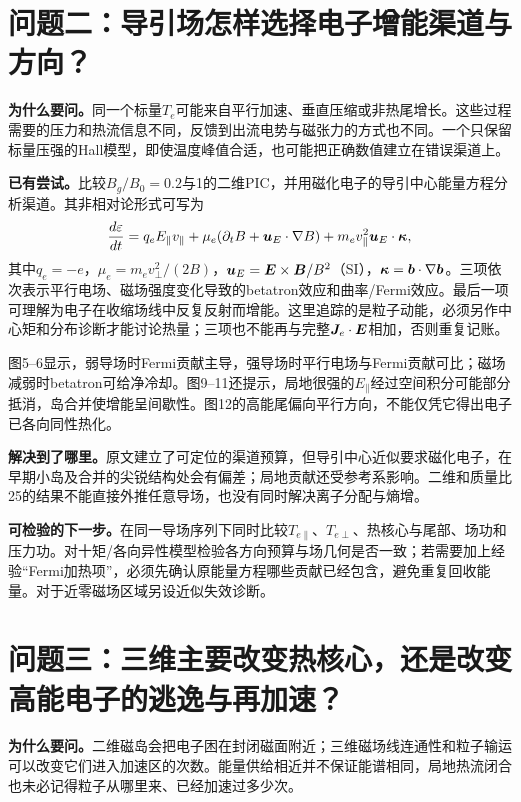 \section{问题二：导引场怎样选择电子增能渠道与方向？}
\textbf{为什么要问。}同一个标量$T_e$可能来自平行加速、垂直压缩或非热尾增长。这些过程需要的压力和热流信息不同，反馈到出流电势与磁张力的方式也不同。一个只保留标量压强的Hall模型，即使温度峰值合适，也可能把正确数值建立在错误渠道上。

\textbf{已有尝试。}\citet{Dahlin2014Mechanisms}比较$B_g/B_0=0.2$与1的二维PIC，并用磁化电子的导引中心能量方程分析渠道。其非相对论形式可写为
\begin{equation}
 \frac{d\varepsilon}{dt}
 =q_eE_\parallel v_\parallel
 +\mu_e(\partial_t B+\bm{u}_E\cdot\nabla B)
 +m_ev_\parallel^2\bm{u}_E\cdot\bm{\kappa},
 \label{eq:question-gc}
\end{equation}
其中$q_e=-e$，$\mu_e=m_ev_\perp^2/(2B)$，$\bm{u}_E=\bm{E}\times\bm{B}/B^2$（SI），$\bm{\kappa}=\bm{b}\cdot\nabla\bm{b}$。三项依次表示平行电场、磁场强度变化导致的betatron效应和曲率/Fermi效应。最后一项可理解为电子在收缩场线中反复反射而增能。这里追踪的是粒子动能，必须另作中心矩和分布诊断才能讨论热量；三项也不能再与完整$\bm{J}_e\cdot\bm{E}$相加，否则重复记账。

图5--6显示，弱导场时Fermi贡献主导，强导场时平行电场与Fermi贡献可比；磁场减弱时betatron可给净冷却。图9--11还提示，局地很强的$E_\parallel$经过空间积分可能部分抵消，岛合并使增能呈间歇性。图12的高能尾偏向平行方向，不能仅凭它得出电子已各向同性热化。\citep{Dahlin2014Mechanisms}

\textbf{解决到了哪里。}原文建立了可定位的渠道预算，但导引中心近似要求磁化电子，在早期小岛及合并的尖锐结构处会有偏差；局地贡献还受参考系影响。二维和质量比25的结果不能直接外推任意导场，也没有同时解决离子分配与熵增。

\textbf{可检验的下一步。}在同一导场序列下同时比较$T_{e\parallel}$、$T_{e\perp}$、热核心与尾部、场功和压力功。对十矩/各向异性模型检验各方向预算与场几何是否一致；若需要加上经验“Fermi加热项”，必须先确认原能量方程哪些贡献已经包含，避免重复回收能量。对于近零磁场区域另设近似失效诊断。


\section{问题三：三维主要改变热核心，还是改变高能电子的逃逸与再加速？}
\textbf{为什么要问。}二维磁岛会把电子困在封闭磁面附近；三维磁场线连通性和粒子输运可以改变它们进入加速区的次数。能量供给相近并不保证能谱相同，局地热流闭合也未必记得粒子从哪里来、已经加速过多少次。


